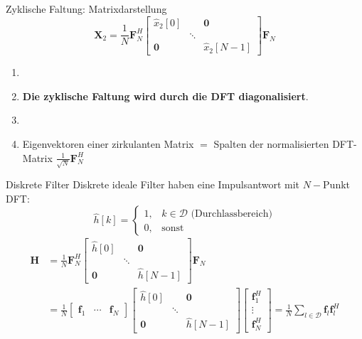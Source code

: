 \documentclass[14pt, aspectratio=169, handout]{beamer}
\begin{document}
\begin{frame}{Zyklische Faltung: Matrixdarstellung}
  $$ \mathbf{X}_2 = \frac{1}{N} \mathbf{F}_N^H  \begin{bmatrix}
        \hat{x}_2[0] & & \mathbf{0} \\
        & \ddots & \\
        \mathbf{0} & & \hat{x}_2[N-1]
    \end{bmatrix}  \mathbf{F}_N $$

    \begin{enumerate}
        \item[]
        \item \textbf{Die zyklische Faltung wird durch die DFT diagonalisiert}.
        \item[] 
        \item Eigenvektoren einer zirkulanten Matrix $=$ Spalten der normalisierten DFT-Matrix $\frac{1}{\sqrt{N}}\mathbf{F}_N^H$
    \end{enumerate}
\end{frame}

\begin{frame}{Diskrete Filter}
    Diskrete ideale Filter haben eine Impulsantwort mit $N-$Punkt DFT:
$$\hat{h}[k] = \begin{cases}
    1, \hspace{10pt} k \in \mathcal{D} \text{ (Durchlassbereich)} \\
    0, \hspace{10pt} \text{sonst}
\end{cases}$$
\small{
\begin{align*}
    \mathbf{H} &= \frac{1}{N} \mathbf{F}_N^H \begin{bmatrix}
        \hat{h}[0] & & \mathbf{0} \\
        & \ddots & \\
        \mathbf{0} & & \hat{h}[N-1]
    \end{bmatrix} \mathbf{F}_N \\
    &= \frac{1}{N} \begin{bmatrix}
        \mathbf{f}_1 & \cdots & \mathbf{f}_N
    \end{bmatrix} \begin{bmatrix}
        \hat{h}[0] & & \mathbf{0} \\
        & \ddots & \\
        \mathbf{0} & & \hat{h}[N-1]
    \end{bmatrix} \begin{bmatrix}
        \mathbf{f}_1^H \\
        \vdots \\
        \mathbf{f}_N^H
    \end{bmatrix} = \frac{1}{N} \sum_{l \in \mathcal{D}} \mathbf{f}_l \mathbf{f}_l^H
\end{align*}}

\end{frame}
\end{document}

